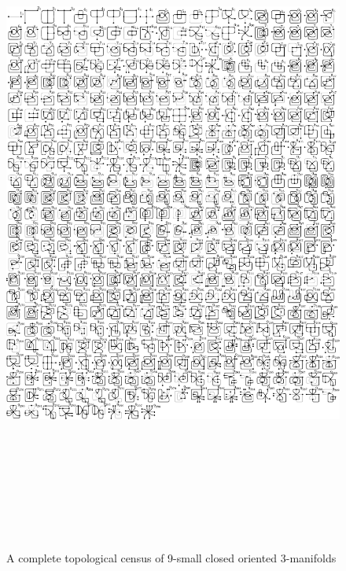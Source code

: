 \begin{figure}[h!tp]
   \begin{center}
      \leavevmode
      \includegraphics[height=22.5cm]{E.figsbw2/primespace489representants_bw.pdf}
   \end{center}
   \vspace{-0.7cm}
   \caption{A complete topological census of 9-small closed oriented 3-manifolds}
   \label{fig:primeSpace487Representatives}
\end{figure}

